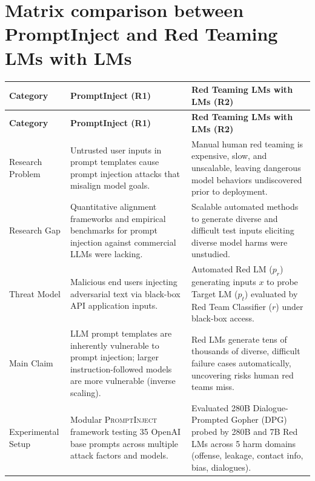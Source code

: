 \documentclass[a4paper,12pt]{report}
\begin{document}
\chapter{Matrix comparison between PromptInject and Red Teaming LMs with LMs}
 
\small
\renewcommand{\arraystretch}{1.2}
\setlength{\tabcolsep}{5pt}
\begin{longtable}{@{}>{\raggedright\arraybackslash}p{}
                    >{\raggedright\arraybackslash}p{}
                    >{\raggedright\arraybackslash}p{}@{}}
\toprule
\textbf{Category} & \textbf{PromptInject (R1)} & \textbf{Red Teaming LMs with LMs (R2)} \\
\midrule
\endfirsthead
\toprule
\textbf{Category} & \textbf{PromptInject (R1)} & \textbf{Red Teaming LMs with LMs (R2)} \\
\midrule
\endhead
\bottomrule
\endlastfoot
 
Research Problem &
Untrusted user inputs in prompt templates cause prompt injection attacks that misalign model goals. &
Manual human red teaming is expensive, slow, and unscalable, leaving dangerous model behaviors undiscovered prior to deployment. \\
 
Research Gap &
Quantitative alignment frameworks and empirical benchmarks for prompt injection against commercial LLMs were lacking. &
Scalable automated methods to generate diverse and difficult test inputs eliciting diverse model harms were unstudied. \\
 
Threat Model &
Malicious end users injecting adversarial text via black-box API application inputs. &
Automated Red LM ($p_r$) generating inputs $x$ to probe Target LM ($p_t$) evaluated by Red Team Classifier ($r$) under black-box access. \\
 
Main Claim &
LLM prompt templates are inherently vulnerable to prompt injection; larger instruction-followed models are more vulnerable (inverse scaling). &
Red LMs generate tens of thousands of diverse, difficult failure cases automatically, uncovering risks human red teams miss. \\
 
Experimental Setup &
Modular \textsc{PromptInject} framework testing 35 OpenAI base prompts across multiple attack factors and models. &
Evaluated 280B Dialogue-Prompted Gopher (DPG) probed by 280B and 7B Red LMs across 5 harm domains (offense, leakage, contact info, bias, dialogues). \\
 

\end{longtable}
\end{document}

